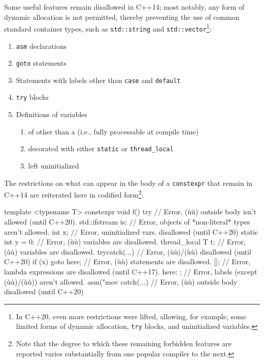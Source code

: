 \noindent Some useful features remain disallowed in C++14; most notably, any form
of dynamic allocation is not permitted, thereby preventing the use of
common standard container types, such as \lstinline!std::string! and
\lstinline!std::vector!{\cprotect\footnote{In C++20, even more
restrictions were lifted, allowing, for example, some limited forms of
  dynamic allocation, \lstinline!try! blocks, and uninitialized variables.}}:
\begin{enumerate}
\item{\lstinline!asm! declarations}
\item{\lstinline!goto! statements}
\item{Statements with labels other than \lstinline!case! and \lstinline!default!}
\item{\lstinline!try! blocks}
\item{Definitions of variables
\begin{enumerate}
\item{of other than a  (i.e., fully processable at compile time)}
\item{decorated with either \lstinline!static! or \lstinline!thread_local!}
\item{left uninitialized}
\end{enumerate}
}
\end{enumerate}
The restrictions on what can appear in the body of a \lstinline!constexpr!
that remain in C++14 are reiterated here in codified
form\footnote{Note that the degree to which these remaining forbidden features are reported varies substantially from one popular compiler to the next.}:

\begin{emcppslisting}[emcppsstandards={c++14}]
template <typename T>
constexpr void f()
{
try {                  // Error, (ù{}ù) outside body isn't allowed (until C++20).
    std::ifstream is;  // Error, objects of *non-literal* types aren't allowed.
    int x;             // Error, uninitialized vars. disallowed (until C++20)
    static int y = 0;  // Error, (ù{}ù) variables are disallowed.
    thread_local T t;  // Error, (ù{}ù) variables are disallowed.
    try{}catch(...){}  // Error, (ù{}ù)/(ù{}ù) disallowed (until C++20)
    if (x) goto here;  // Error, (ù{}ù) statements are disallowed.
    []{};              // Error, lambda expressions are disallowed (until C++17).
here: ;                // Error, labels (except (ù{}ù)/(ù{}ù)) aren't allowed.
    asm("mov %
} catch(...) { }       // Error, (ù{}ù) outside body disallowed (until C++20)
}
\end{emcppslisting}
    

